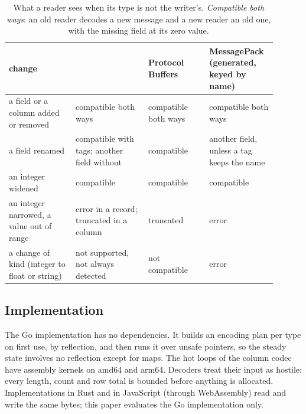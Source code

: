 \begin{table}[t]
\centering\footnotesize
\begin{tabular}{@{}p{0.23\linewidth}p{0.25\linewidth}p{0.21\linewidth}p{0.21\linewidth}@{}}
\toprule
change & \colbin{} & Protocol Buffers & MessagePack (generated, keyed by name) \\
\midrule
a field or a column added or removed & compatible both ways & compatible both ways & compatible both ways \\
a field renamed & compatible with tags; another field without & compatible & another field, unless a tag keeps the name \\
an integer widened & compatible & compatible & compatible \\
an integer narrowed, a value out of range & error in a record; truncated in a column & truncated & error \\
a change of kind (integer to float or string) & not supported, not always detected & not compatible & error \\
\bottomrule
\end{tabular}
\caption{What a reader sees when its type is not the writer's. \emph{Compatible
both ways}: an old reader decodes a new message and a new reader an old one,
with the missing field at its zero value.}
\label{tab:evolution}
\end{table}

\subsection{Implementation}

The Go implementation has no dependencies. It builds an encoding plan per
type on first use, by reflection, and then runs it over unsafe pointers, so
the steady state involves no reflection except for maps. The hot loops of the
column codec have assembly kernels on amd64 and arm64. Decoders treat their
input as hostile: every length, count and row total is bounded before
anything is allocated. Implementations in Rust and in JavaScript (through
WebAssembly) read and write the same bytes; this paper evaluates the Go
implementation only.
